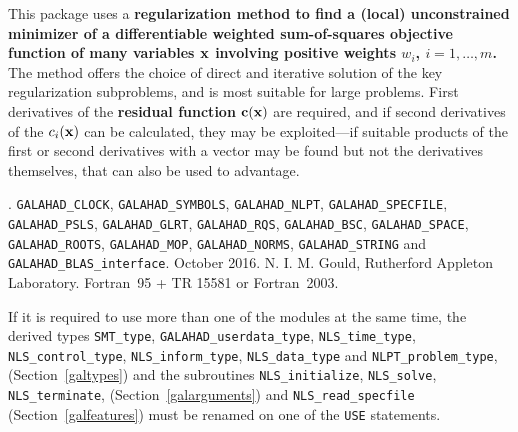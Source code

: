\documentclass{galahad}
\newcommand{\packagename}{NLS}
\newcommand{\fullpackagename}{\libraryname\_\packagename}
\begin{document}
\galheader


\galsummary
This package uses a {\bf regularization method to find a (local)
unconstrained minimizer of a differentiable weighted sum-of-squares objective
function
of many variables ${\mathbf{x}}$ involving positive weights $w_i$, $i=1,\ldots,m$.}
The method offers the choice of direct and iterative solution of the key
regularization subproblems, and is most suitable for large problems.
First derivatives of the {\bf residual function}
${\mathbf{c}}({\mathbf{x}})$ are required, and if second derivatives of the
$c_i({\mathbf{x}})$ can be calculated, they may be exploited---if suitable products
of the first or second derivatives with a vector may be found but not the
derivatives themselves, that can also be used to advantage.


\galattributes
\galversions{\tt  \fullpackagename\_single, \fullpackagename\_double}.
\galuses
{\tt GALAHAD\_CLOCK},
{\tt GALAHAD\_SY\-M\-BOLS},
{\tt GALAHAD\_NLPT},
{\tt GALAHAD\_SPECFILE},
{\tt GALAHAD\_PSLS},
{\tt GALAHAD\_GLRT},
{\tt GALAHAD\_RQS},
{\tt GALAHAD\_BSC},
{\tt GALAHAD\_\-SPACE},
{\tt GALAHAD\_ROOTS},
{\tt GALAHAD\_MOP},
{\tt GALAHAD\_NORMS},
{\tt GALAHAD\_STRING}
and
{\tt GALAHAD\_BLAS\_interface}.
\galdate October 2016.
\galorigin N. I. M. Gould, Rutherford Appleton Laboratory.
\gallanguage Fortran~95 + TR 15581 or Fortran~2003.


\galhowto



\noindent
If it is required to use more than one of the modules at the same time, 
the derived types
{\tt SMT\_type},
{\tt GALAHAD\_userdata\_type},
{\tt \packagename\_time\_\-type},
{\tt \packagename\_control\_type},
{\tt \packagename\_inform\_type},
{\tt \packagename\_data\_type}
and
{\tt NLPT\_problem\_type},
(Section~\ref{galtypes})
and the subroutines
{\tt \packagename\_initialize},
{\tt \packagename\_\-solve},
{\tt \packagename\_terminate},
(Section~\ref{galarguments})
and
{\tt \packagename\_read\_specfile}
(Section~\ref{galfeatures})
must be renamed on one of the {\tt USE} statements.
\end{document}
